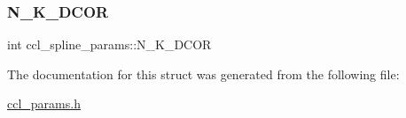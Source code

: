 \mbox{\label{structccl__spline__params_a68330cc26e66cb4eca93aca832ee6366}} 
\subsubsection{\texorpdfstring{N\+\_\+\+K\+\_\+D\+C\+OR}{N\_K\_3DCOR}}
{\footnotesize\ttfamily int ccl\+\_\+spline\+\_\+params\+::\+N\+\_\+\+K\+\_\+D\+C\+OR}



The documentation for this struct was generated from the following file\+:\begin{DoxyCompactItemize}
\item 
\mbox{\hyperlink{ccl__params_8h}{ccl\+\_\+params.\+h}}\end{DoxyCompactItemize}
